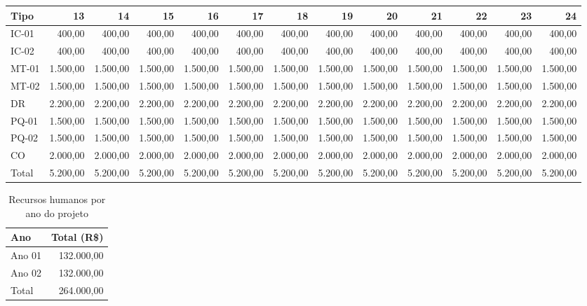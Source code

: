 \begin{table}[h!]
\begin{tabular}{ lrrrrrrrrrrrr}
\midrule
\midrule
   \rowcolor{lgray}
   Tipo      & 13      & 14      & 15      & 16      & 17      & 18      & 19      & 20      & 21      & 22      & 23      & 24      \\
\midrule
   IC-01     &   400,00&   400,00&   400,00&   400,00&   400,00&   400,00&   400,00&   400,00&   400,00&   400,00&   400,00&   400,00\\
   IC-02     &   400,00&   400,00&   400,00&   400,00&   400,00&   400,00&   400,00&   400,00&   400,00&   400,00&   400,00&   400,00\\
   MT-01     & 1.500,00& 1.500,00& 1.500,00& 1.500,00& 1.500,00& 1.500,00& 1.500,00& 1.500,00& 1.500,00& 1.500,00& 1.500,00& 1.500,00\\
   MT-02     & 1.500,00& 1.500,00& 1.500,00& 1.500,00& 1.500,00& 1.500,00& 1.500,00& 1.500,00& 1.500,00& 1.500,00& 1.500,00& 1.500,00\\
   DR        & 2.200,00& 2.200,00& 2.200,00& 2.200,00& 2.200,00& 2.200,00& 2.200,00& 2.200,00& 2.200,00& 2.200,00& 2.200,00& 2.200,00\\
   PQ-01     & 1.500,00& 1.500,00& 1.500,00& 1.500,00& 1.500,00& 1.500,00& 1.500,00& 1.500,00& 1.500,00& 1.500,00& 1.500,00& 1.500,00\\
   PQ-02     & 1.500,00& 1.500,00& 1.500,00& 1.500,00& 1.500,00& 1.500,00& 1.500,00& 1.500,00& 1.500,00& 1.500,00& 1.500,00& 1.500,00\\
   CO        & 2.000,00& 2.000,00& 2.000,00& 2.000,00& 2.000,00& 2.000,00& 2.000,00& 2.000,00& 2.000,00& 2.000,00& 2.000,00& 2.000,00\\
	\midrule
   Total     & 5.200,00& 5.200,00& 5.200,00& 5.200,00& 5.200,00& 5.200,00& 5.200,00& 5.200,00& 5.200,00& 5.200,00& 5.200,00& 5.200,00\\
\bottomrule
\end{tabular}
	\label{tab:rhmes}
\end{table}

\begin{table}[!h]
\centering
	\caption{Recursos humanos por ano do projeto}
\begin{tabular}{ lr}
\toprule
   Ano       & Total (R\$)  \\
\midrule
   Ano 01    &   132.000,00 \\
   Ano 02    &   132.000,00 \\
\midrule
   Total     &   264.000,00 \\
\bottomrule
\end{tabular}
	\label{tab:rhano}
\end{table}

